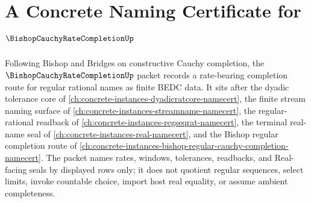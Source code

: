 \chapter{A Concrete Naming Certificate for $\BishopCauchyRateCompletionUp$}
\label{ch:concrete-instances-bishop-cauchy-rate-completion-namecert}

Following Bishop and Bridges on constructive Cauchy completion, the $\BishopCauchyRateCompletionUp$ packet records a rate-bearing completion route for regular rational names as finite BEDC data. It sits after the dyadic tolerance core of \autoref{ch:concrete-instances-dyadicratcore-namecert}, the finite stream naming surface of \autoref{ch:concrete-instances-streamname-namecert}, the regular-rational readback of \autoref{ch:concrete-instances-regseqrat-namecert}, the terminal real-name seal of \autoref{ch:concrete-instances-real-namecert}, and the Bishop regular completion route of \autoref{ch:concrete-instances-bishop-regular-cauchy-completion-namecert}. The packet names rates, windows, tolerances, readbacks, and Real-facing seals by displayed rows only; it does not quotient regular sequences, select limits, invoke countable choice, import host real equality, or assume ambient completeness.

